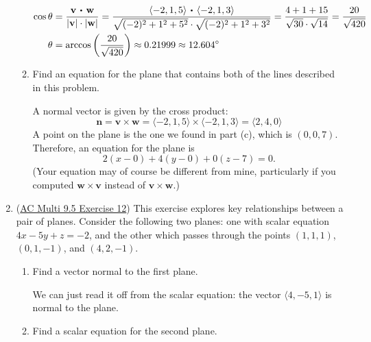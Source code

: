 \documentclass[10pt]{article}
\newcommand{\vv}{\mathbf{v}}
\newcommand{\vw}{\mathbf{w}}
\newcommand{\vn}{\mathbf{n}}
\newcommand\dotp[1][.5]{\,\mathbin{\vcenter{\hbox{\scalebox{#1}{$\bullet$}}}}\,}
\newenvironment{red}{\color{red}}{\ignorespacesafterend}
\begin{document}
\begin{enumerate}[leftmargin=0pt]
\begin{enumerate}
	\begin{red}
		\begin{align*}
			\cos\theta &= \dfrac{\vv \dotp \vw}{|\vv|\cdot|\vw|}
			= \dfrac{\langle -2, 1, 5 \rangle \dotp \langle -2, 1, 3 \rangle}{\sqrt{(-2)^2 + 1^2 + 5^2} \cdot \sqrt{(-2)^2 + 1^2 + 3^2}} = \dfrac{4 + 1 + 15}{\sqrt{30} \cdot \sqrt{14}} = \dfrac{20}{\sqrt{420}} \\
			\theta &= \arccos\left(\dfrac{20}{\sqrt{420}}\right)\approx 0.21999 \approx 12.604^\circ 
		\end{align*}
	\end{red}
	\item Find an equation for the plane that contains both of the lines described in this problem.
	
	\begin{red}
		A normal vector is given by the cross product:
		\[\vn = \vv\times\vw =  \langle -2, 1, 5 \rangle \times \langle -2, 1, 3 \rangle = \langle 2, 4, 0 \rangle\]
		A point on the plane is the one we found in part (c), which is $(0, 0, 7)$. Therefore, an equation for the plane is 
		\[ 2(x-0) + 4(y-0) + 0(z-7) = 0. \]
		(Your equation may of course be different from mine, particularly if you computed $\vw\times\vv$ instead of $\vv\times\vw$.)
	\end{red}
\end{enumerate}

\item (\href{https://activecalculus.org/multi/S-9-5-Lines-Planes.html#Ez_9_5_3}{AC Multi 9.5 Exercise 12}) This exercise explores key relationships between a pair of planes. Consider the following two planes: one with scalar equation $4x-5y+z = -2$, and the other which passes through the points $(1,1,1)$, $(0, 1, -1)$, and $(4, 2, -1)$.
\begin{enumerate}
	\item Find a vector normal to the first plane.
	
	\begin{red}
		We can just read it off from the scalar equation: the vector $\langle 4, -5, 1\rangle$ is normal to the plane.
	\end{red}
	\item Find a scalar equation for the second plane.
	

\end{enumerate}
\end{enumerate}
\end{document}

